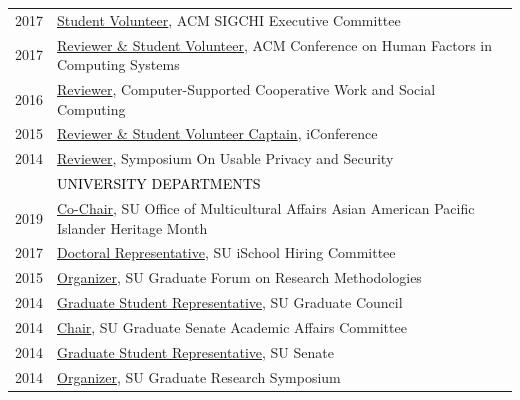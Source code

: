 \documentclass[12pt]{article}
\begin{document}
{\begin{longtable}{R{0.75in}p{5.0in}}
\footnotesize{2017} & \href{https://sigchi.org/}{Student Volunteer}, ACM SIGCHI Executive Committee\\

\footnotesize{2017} & \href{https://chi2017.acm.org/}{Reviewer \& Student Volunteer}, ACM Conference on Human Factors in Computing Systems\\

\footnotesize{2016} & \href{https://cscw.acm.org/}{Reviewer}, Computer-Supported Cooperative Work and Social Computing\\

\footnotesize{2015} & \href{https://www.ischools.org/iconference}{Reviewer \& Student Volunteer Captain}, iConference\\

\footnotesize{2014} & \href{https://www.usenix.org/sites/default/files/soups14_proceedings.pdf}{Reviewer}, Symposium On Usable Privacy and Security \medskip \\

& \large \textcolor{black}{\uppercase{University Departments}}\\

\footnotesize{2019} & \href{https://dailyorange.com/2019/04/su-alum-deliver-lecture-industry-experience-cultural-identity-aapi-month/}{Co-Chair}, SU Office of Multicultural Affairs Asian American Pacific Islander Heritage Month\\

\footnotesize{2017} & \href{https://ischool.syr.edu/}{Doctoral Representative}, SU iSchool Hiring Committee\\

\footnotesize{2015} & \href{https://web.archive.org/web/20180119000045/https://gradresearch.syr.edu/symposium/}{Organizer}, SU Graduate Forum on Research Methodologies\\

\footnotesize{2014} & \href{https://gradorg.syr.edu/senate/committees/}{Graduate Student Representative}, SU Graduate Council\\

\footnotesize{2014} & \href{https://gradorg.syr.edu/senate/committees/}{Chair}, SU Graduate Senate Academic Affairs Committee\\

\footnotesize{2014} & \href{https://universitysenate.syr.edu/}{Graduate Student Representative}, SU Senate\\

\footnotesize{2014} & \href{https://web.archive.org/web/20180119000045/https://gradresearch.syr.edu/symposium/}{Organizer}, SU Graduate Research Symposium\\


\end{longtable}}
\end{document}
